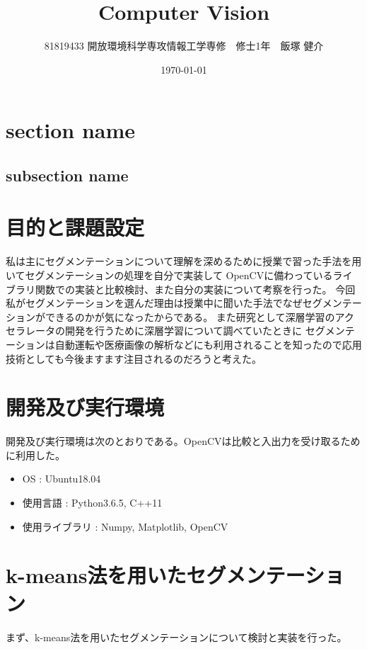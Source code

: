 \documentclass[11pt,a4j]{jsarticle}
\title{Computer Vision}
\author{81819433 開放環境科学専攻情報工学専修　修士1年　飯塚 健介}
\date{\today}
\begin{document}
    \maketitle

    \section{section name}
    \subsection{subsection name}

    \section{目的と課題設定}
    私は主にセグメンテーションについて理解を深めるために授業で習った手法を用いてセグメンテーションの処理を自分で実装して
    OpenCVに備わっているライブラリ関数での実装と比較検討、また自分の実装について考察を行った。
    今回私がセグメンテーションを選んだ理由は授業中に聞いた手法でなぜセグメンテーションができるのかが気になったからである。
    また研究として深層学習のアクセラレータの開発を行うために深層学習について調べていたときに
    セグメンテーションは自動運転や医療画像の解析などにも利用されることを知ったので応用技術としても今後ますます注目されるのだろうと考えた。



    \section{開発及び実行環境}
    開発及び実行環境は次のとおりである。OpenCVは比較と入出力を受け取るために利用した。
    \begin{itemize}
        \item OS : Ubuntu18.04 
        \item 使用言語 : Python3.6.5, C++11 
        \item 使用ライブラリ : Numpy, Matplotlib, OpenCV 
       \end{itemize}

    \section{k-means法を用いたセグメンテーション}
    まず、k-means法を用いたセグメンテーションについて検討と実装を行った。
\end{document}
